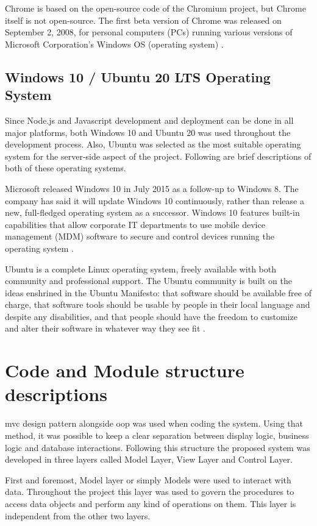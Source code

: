 \documentclass[12pt]{report}
\begin{document}
Chrome is based on the open-source code of the Chromium project, but Chrome itself is not open-source. The first beta version of Chrome was released on September 2, 2008, for personal computers (PCs) running various versions of Microsoft Corporation's Windows OS (operating system) \cite{hosch_2020_google_chrome}.

\subsection{Windows 10 / Ubuntu 20 LTS Operating System}
Since Node.js and Javascript development and deployment can be done in all major platforms, both Windows 10 and Ubuntu 20 was used throughout the development process. Also, Ubuntu was selected as the most suitable operating system for the server-side aspect of the project. Following are brief descriptions of both of these operating systems.

Microsoft released Windows 10 in July 2015 as a follow-up to Windows 8. The company has said it will update Windows 10 continuously, rather than release a new, full-fledged operating system as a successor. Windows 10 features built-in capabilities that allow corporate IT departments to use mobile device management (MDM) software to secure and control devices running the operating system \cite{margaretrouse_2017_windows10}.

Ubuntu is a complete Linux operating system, freely available with both community and professional support. The Ubuntu community is built on the ideas enshrined in the Ubuntu Manifesto: that software should be available free of charge, that software tools should be usable by people in their local language and despite any disabilities, and that people should have the freedom to customize and alter their software in whatever way they see fit \cite{ubuntu_2019_introduction}.


\section{Code and Module structure descriptions}
\acrshort{mvc} design pattern alongside \acrshort{oop} was used when coding the system. Using that method, it was possible to keep a clear separation between display logic, business logic and database interactions. Following this structure the proposed system was developed in three layers called Model Layer, View Layer and Control Layer.

First and foremost, Model layer or simply Models were used to interact with data. Throughout the project this layer was used to govern the procedures to access data objects and perform any kind of operations on them. This layer is independent from the other two layers.
\end{document}
